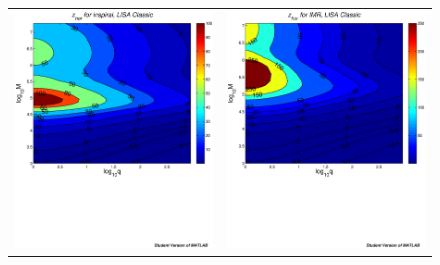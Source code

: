 \documentclass{iopart}
\begin{document}
%

%
\begin{figure}[H]
\begin{center}
\begin{tabular}{cc}
\includegraphics[scale=0.41,clip=true]{FigEmanuele/InspZhorContour.ps}
&\includegraphics[scale=0.41,clip=true]{FigEmanuele/IMRZhorContour.ps}\\

\end{tabular}
\end{center}
\end{figure}
\end{document}

